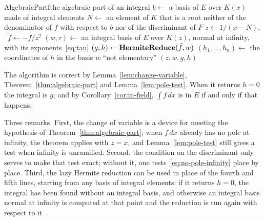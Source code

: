 \begin{algo}{AlgebraicPart}{f}{the algebraic part of an integral}
\State $b \gets$ a basis of $E$ over $K(x)$ made of integral elements
\State $N \gets$ an element of $K$ that is a root neither of the denominator of $f$ with respect to $b$ nor of the discriminant of $F$
\State $z \gets 1/(x - N)$, \ $\tilde f \gets -f / z^2$ 
\State $(w, \tau) \gets$ an integral basis of $E$ over $K(z)$, normal at infinity, with its exponents~\eqref{eq:tau} 
\State $(g, h) \gets \textbf{HermiteReduce}(\tilde f, w)$ 
\State $(h_1, \dots, h_n) \gets$ the coordinates of $h$ in the basis $w$
 
  \State \Return ``not elementary''
\EndIf
\State \Return $(z, w, g, h)$
\end{algo}

The algorithm is correct by Lemma~\ref{lem:change-variable},
Theorem~\ref{thm:algebraic-part} and Lemma~\ref{lem:pole-test}. When it
returns $h = 0$ the integral is $g$; and by Corollary~\ref{cor:in-field},
$\int f\,dx$ is in $E$ if and only if that happens.

Three remarks. First, the change of variable is a device for meeting the
hypothesis of Theorem~\ref{thm:algebraic-part}; when $f\,dx$ already has no
pole at infinity, the theorem applies with $z = x$, and
Lemma~\ref{lem:pole-test} still gives a test when infinity is unramified.
Second, the condition on the discriminant only serves to make that test
exact; without it, one tests~\eqref{eq:no-pole-infinity} place by place.
Third, the lazy Hermite reduction can be used in place of the fourth and
fifth lines, starting from any basis of integral elements: if it returns $h =
0$, the integral has been found without an integral basis, and otherwise an
integral basis normal at infinity is computed at that point and the reduction
is run again with respect to it~\cite[\S2.4]{bronstein1998tutorial}.

